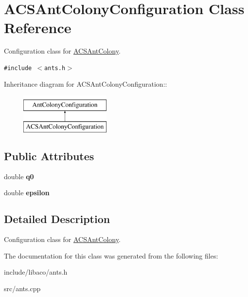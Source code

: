 \hypertarget{classACSAntColonyConfiguration}{
\section{ACSAntColonyConfiguration Class Reference}
\label{classACSAntColonyConfiguration}
}
Configuration class for \hyperlink{classACSAntColony}{ACSAntColony}.  


{\tt \#include $<$ants.h$>$}

Inheritance diagram for ACSAntColonyConfiguration::\begin{figure}[H]
\begin{center}
\leavevmode
\includegraphics[height=2cm]{classACSAntColonyConfiguration}
\end{center}
\end{figure}
\subsection*{Public Attributes}
\begin{CompactItemize}
\item 
\hypertarget{classACSAntColonyConfiguration_237f5ebe10da6ad5b037f207ae9ed939}{
double \textbf{q0}}
\label{classACSAntColonyConfiguration_237f5ebe10da6ad5b037f207ae9ed939}

\item 
\hypertarget{classACSAntColonyConfiguration_400bf6805f0d9a82086d4ecbfbb1dfb3}{
double \textbf{epsilon}}
\label{classACSAntColonyConfiguration_400bf6805f0d9a82086d4ecbfbb1dfb3}

\end{CompactItemize}


\subsection{Detailed Description}
Configuration class for \hyperlink{classACSAntColony}{ACSAntColony}. 

The documentation for this class was generated from the following files:\begin{CompactItemize}
\item 
include/libaco/ants.h\item 
src/ants.cpp\end{CompactItemize}

